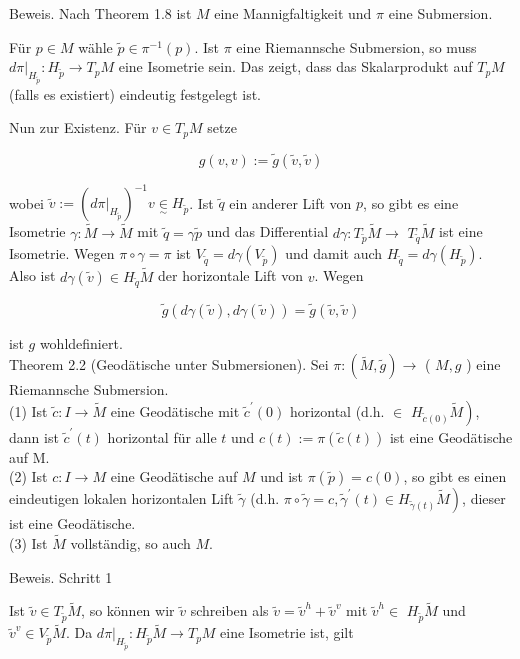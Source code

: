 \documentclass[10pt]{article}
\begin{document}
Beweis. Nach Theorem 1.8 ist $M$ eine Mannigfaltigkeit und $\pi$ eine Submersion.

Für $p \in M$ wähle $\tilde{p} \in \pi^{-1}(p)$. Ist $\pi$ eine Riemannsche Submersion, so muss $\left.d \pi\right|_{H_{\tilde{p}}}: H_{\tilde{p}} \rightarrow T_{p} M$ eine Isometrie sein. Das zeigt, dass das Skalarprodukt auf $T_{p} M$ (falls es existiert) eindeutig festgelegt ist.

Nun zur Existenz. Für $v \in T_{p} M$ setze

$$
g(v, v):=\tilde{g}(\tilde{v}, \tilde{v})
$$

wobei $\tilde{v}:=\left(\left.d \pi\right|_{H_{\tilde{p}}}\right)^{-1} v \underset{\sim}{\in} H_{\tilde{p}}$. Ist $\tilde{q}$ ein anderer Lift von $p$, so gibt es eine Isometrie $\gamma: \tilde{M} \rightarrow \tilde{M}$ mit $\tilde{q}=\gamma \tilde{p}$ und das Differential $d \gamma: T_{\tilde{p}} \tilde{M} \rightarrow$ $T_{\tilde{q}} \tilde{M}$ ist eine Isometrie. Wegen $\pi \circ \gamma=\pi$ ist $V_{\tilde{q}}=d \gamma\left(V_{\tilde{p}}\right)$ und damit auch $H_{\tilde{q}}=d \gamma\left(H_{\tilde{p}}\right)$. Also ist $d \gamma(\tilde{v}) \in H_{\tilde{q}} \tilde{M}$ der horizontale Lift von $v$. Wegen

$$
\tilde{g}(d \gamma(\tilde{v}), d \gamma(\tilde{v}))=\tilde{g}(\tilde{v}, \tilde{v})
$$

ist $g$ wohldefiniert.\\
Theorem 2.2 (Geodätische unter Submersionen). Sei $\pi:(\tilde{M}, \tilde{g}) \rightarrow$ ( $M, g$ ) eine Riemannsche Submersion.\\
(1) Ist $\tilde{c}: I \rightarrow \tilde{M}$ eine Geodätische mit $\tilde{c}^{\prime}(0)$ horizontal (d.h. $\in$ $\left.H_{\tilde{c}(0)} \tilde{M}\right)$, dann ist $\tilde{c}^{\prime}(t)$ horizontal für alle $t$ und $c(t):=\pi(\tilde{c}(t))$ ist eine Geodätische auf M.\\
(2) Ist $c: I \rightarrow M$ eine Geodätische auf $M$ und ist $\pi(\tilde{p})=c(0)$, so gibt es einen eindeutigen lokalen horizontalen Lift $\tilde{\gamma}$ (d.h. $\left.\pi \circ \tilde{\gamma}=c, \tilde{\gamma}^{\prime}(t) \in H_{\tilde{\gamma}(t)} \tilde{M}\right)$, dieser ist eine Geodätische.\\
(3) Ist $\tilde{M}$ vollständig, so auch $M$.

Beweis. Schritt 1

Ist $\tilde{v} \in T_{\tilde{p}} \tilde{M}$, so können wir $\tilde{v}$ schreiben als $\tilde{v}=\tilde{v}^{h}+\tilde{v}^{v}$ mit $\tilde{v}^{h} \in$ $H_{\tilde{p}} \tilde{M}$ und $\tilde{v}^{v} \in V_{\tilde{p}} \tilde{M}$. Da $\left.d \pi\right|_{H_{\tilde{p}}}: H_{\tilde{p}} \tilde{M} \rightarrow T_{p} M$ eine Isometrie ist, gilt
\end{document}
